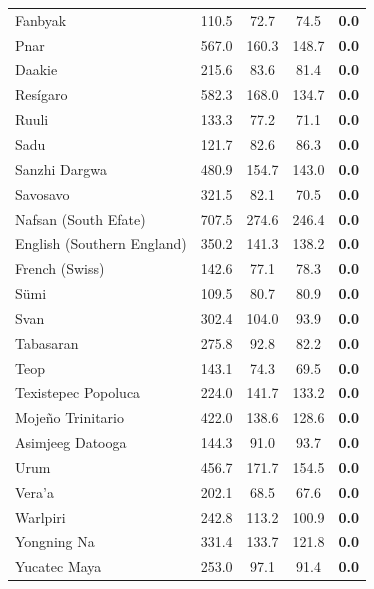 \begin{longtable}{lcccc}
Fanbyak & 110.5 & 72.7 & 74.5 & \textbf{0.0} \\
Pnar & 567.0 & 160.3 & 148.7 & \textbf{0.0} \\
Daakie & 215.6 & 83.6 & 81.4 & \textbf{0.0} \\
Resígaro & 582.3 & 168.0 & 134.7 & \textbf{0.0} \\
Ruuli & 133.3 & 77.2 & 71.1 & \textbf{0.0} \\
Sadu & 121.7 & 82.6 & 86.3 & \textbf{0.0} \\
Sanzhi Dargwa & 480.9 & 154.7 & 143.0 & \textbf{0.0} \\
Savosavo & 321.5 & 82.1 & 70.5 & \textbf{0.0} \\
Nafsan (South Efate) & 707.5 & 274.6 & 246.4 & \textbf{0.0} \\
English (Southern England) & 350.2 & 141.3 & 138.2 & \textbf{0.0} \\
French (Swiss) & 142.6 & 77.1 & 78.3 & \textbf{0.0} \\
Sümi & 109.5 & 80.7 & 80.9 & \textbf{0.0} \\
Svan & 302.4 & 104.0 & 93.9 & \textbf{0.0} \\
Tabasaran & 275.8 & 92.8 & 82.2 & \textbf{0.0} \\
Teop & 143.1 & 74.3 & 69.5 & \textbf{0.0} \\
Texistepec Popoluca & 224.0 & 141.7 & 133.2 & \textbf{0.0} \\
Mojeño Trinitario & 422.0 & 138.6 & 128.6 & \textbf{0.0} \\
Asimjeeg Datooga & 144.3 & 91.0 & 93.7 & \textbf{0.0} \\
Urum & 456.7 & 171.7 & 154.5 & \textbf{0.0} \\
Vera'a & 202.1 & 68.5 & 67.6 & \textbf{0.0} \\
Warlpiri & 242.8 & 113.2 & 100.9 & \textbf{0.0} \\
Yongning Na & 331.4 & 133.7 & 121.8 & \textbf{0.0} \\
Yucatec Maya & 253.0 & 97.1 & 91.4 & \textbf{0.0} \\
\end{longtable}
\endgroup